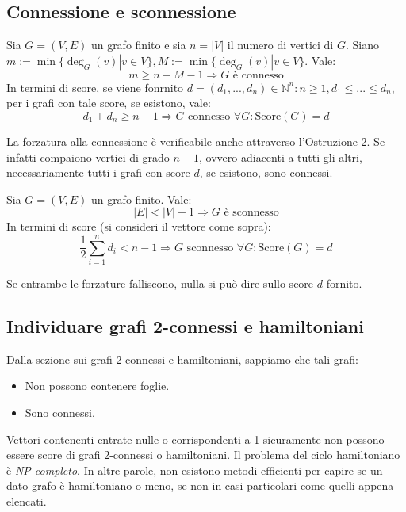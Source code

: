 \subsection*{Connessione e sconnessione}
\begin{tcolorbox}[colback=red!30, colframe=red!30!black, title=Forzatura alla connessione]
Sia $G=(V,E)$ un grafo  finito e sia $n=|V|$ il numero
di vertici di $G$. Siano $m:=\min\{\deg_G(v)|v\in V\},
M:=\min\{\deg_G(v)|v\in V\}$. Vale:
\[ m\geq n-M-1 \Longrightarrow G \text{ è connesso} \]
In termini di score, se viene fonrnito $d=(d_1,...,d_n)\in\mathbb{N}^n:
n\geq1, d_1\leq...\leq d_n$, per i grafi con tale score, se
esistono, vale:
\[ d_1+d_n \geq n-1 \Longrightarrow G\text{ connesso }\forall G:\text{Score}(G)=d \]
\end{tcolorbox}
\begin{osservaz}
La forzatura alla connessione è verificabile
anche attraverso l'Ostruzione 2. Se infatti compaiono vertici di grado
$n-1$, ovvero adiacenti a tutti gli altri, necessariamente tutti i
grafi con score $d$, se esistono, sono connessi.
\end{osservaz}

\begin{tcolorbox}[colback=red!30, colframe=red!30!black, title=Forzatura alla sconnessione]
Sia $G=(V,E)$ un grafo finito. Vale:
\[ |E|<|V|-1 \Longrightarrow G \text{ è sconnesso} \]
In termini di score (si consideri il vettore come sopra):
\[ \frac12\sum_{i=1}^{n}d_i < n-1 \Longrightarrow G\text{ sconnesso } \forall G:\text{Score}(G)=d \]
\end{tcolorbox}
\begin{osservaz}
Se entrambe le forzature falliscono, nulla si può dire sullo score $d$ fornito.
\end{osservaz}

\subsection*{Individuare grafi 2-connessi e hamiltoniani}
\noindent Dalla sezione sui grafi 2-connessi e hamiltoniani, sappiamo che tali
grafi:
\begin{itemize}
\item Non possono contenere foglie.
\item Sono connessi.
\end{itemize}
Vettori contenenti entrate nulle o corrispondenti a 1 sicuramente
non possono essere score di grafi 2-connessi o hamiltoniani.
Il problema del ciclo hamiltoniano è \textit{NP-completo}. In altre
parole, non esistono metodi efficienti per capire se un dato grafo
è hamiltoniano o meno, se non in casi particolari come quelli appena
elencati.





